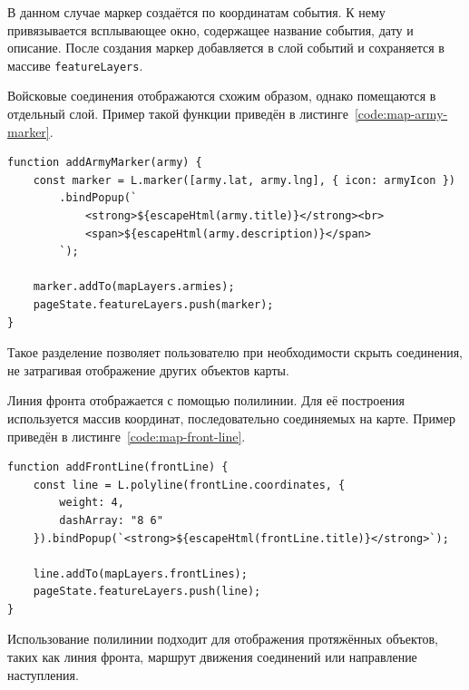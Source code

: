 В данном случае маркер создаётся по координатам события. К нему привязывается всплывающее окно, содержащее название события, дату и описание. После создания маркер добавляется в слой событий и сохраняется в массиве \texttt{featureLayers}.

Войсковые соединения отображаются схожим образом, однако помещаются в отдельный слой. Пример такой функции приведён в листинге~\ref{code:map-army-marker}.

\begin{code}
\label{code:map-army-marker}
\vspace{-0.75cm}
\begin{verbatim}
function addArmyMarker(army) {
    const marker = L.marker([army.lat, army.lng], { icon: armyIcon })
        .bindPopup(`
            <strong>${escapeHtml(army.title)}</strong><br>
            <span>${escapeHtml(army.description)}</span>
        `);

    marker.addTo(mapLayers.armies);
    pageState.featureLayers.push(marker);
}
\end{verbatim}
\end{code}

Такое разделение позволяет пользователю при необходимости скрыть соединения, не затрагивая отображение других объектов карты.

Линия фронта отображается с помощью полилинии. Для её построения используется массив координат, последовательно соединяемых на карте. Пример приведён в листинге~\ref{code:map-front-line}.

\begin{code}
\label{code:map-front-line}
\vspace{-0.75cm}
\begin{verbatim}
function addFrontLine(frontLine) {
    const line = L.polyline(frontLine.coordinates, {
        weight: 4,
        dashArray: "8 6"
    }).bindPopup(`<strong>${escapeHtml(frontLine.title)}</strong>`);

    line.addTo(mapLayers.frontLines);
    pageState.featureLayers.push(line);
}
\end{verbatim}
\end{code}

Использование полилинии подходит для отображения протяжённых объектов, таких как линия фронта, маршрут движения соединений или направление наступления.

